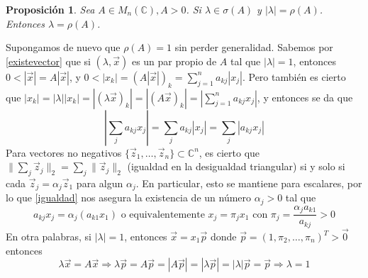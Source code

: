 \documentclass[size=a4, parskip=half, titlepage=false, toc=flat, toc=bib, 12pt, twoside]{scrartcl}
\makeatletter
\renewenvironment{proof}[1][\proofname] {\par\pushQED{\qed}\normalfont\topsep6\p@\@plus6\p@\relax\trivlist\item[\hskip\labelsep\itshape\tgpaella#1\@addpunct{.}]\ignorespaces}{\popQED\endtrivlist\@endpefalse}
\theoremstyle{theorem-style}
\newtheorem{nprop}{Proposición}[section]
\theoremstyle{definition-style}
\theoremstyle{remark-style}
\theoremstyle{example-style}
\theoremstyle{definition-style}
\theoremstyle{remark-style}
\renewcommand{\proofname}{\normalfont\tgpaella\bfseries\small DEMOSTRACIÓN}
\makeatother
\begin{document}
\begin{nprop}
Sea $A \in M_n(\mathbb{C}), A > 0$. Si $\lambda \in \sigma(A)$ y $|\lambda| = \rho(A)$. Entonces $\lambda = \rho(A)$.
\end{nprop}
\begin{proof}
Supongamos de nuevo que $\rho(A) = 1$ sin perder generalidad. Sabemos por \ref{existevector} que si $(\lambda , \vec{x})$ es un par propio de $A$ tal que $|\lambda| = 1$, entonces $0 < |\vec{x}| = A |\vec{x}|$, y $0 < |x_k| = (A|\vec{x}|)_k = \sum_{j = 1}^n a_{kj} |x_j|$. Pero también es cierto que $|x_k| = |\lambda||x_k| = |(\lambda \vec{x})_k| = |(A\vec{x})_k| = |\sum_{j=1}^n a_{kj} x_j|$, y entonces se da que
\begin{equation}\label{igualdad} \left| \sum_{j} a_{kj}x_j \right| = \sum_j a_{kj} |x_j| = \sum_j |a_{kj} x_j| \end{equation}
Para vectores no negativos $\{\vec{z}_1, \dots, \vec{z}_n\} \subset \mathbb{C}^n$, es cierto que $\| \sum_j \vec{z}_j \|_2 = \sum_j \|\vec{z}_j \|_2$ (igualdad en la desigualdad triangular) si y solo si cada $\vec{z}_j = \alpha_j \vec{z}_1$ para algun $\alpha_j$. En particular, esto se mantiene para escalares, por lo que \ref{igualdad} nos asegura la existencia de un número $\alpha_j > 0$ tal que
$$a_{kj}x_j = \alpha_j (a_{k1}x_1) \textrm{ o equivalentemente } x_j = \pi_j x_1 \textrm{ con } \pi_j = \frac{\alpha_j a_{k1}}{a_{kj}} > 0$$
En otra palabras, si $|\lambda| = 1$, entonces $\vec{x} = x_1 \vec{p}$ donde $\vec{p} = (1 , \pi_2, \dots, \pi_n)^T > \vec{0}$ entonces
$$\lambda \vec{x} = A \vec{x} \Rightarrow \lambda \vec{p} = A \vec{p} = |A \vec{p}| = |\lambda \vec{p}| = |\lambda|\vec{p} = \vec{p} \Rightarrow \lambda = 1 $$

\end{proof}
\end{document}
